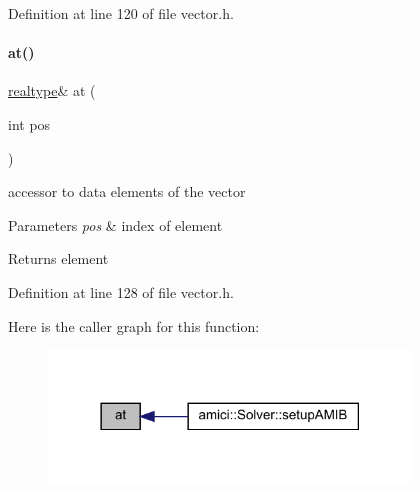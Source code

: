 Definition at line 120 of file vector.\+h.

\mbox{\label{classamici_1_1_ami_vector_ae62cf934983479ccb255785bdf455a2c}} 
\paragraph{\texorpdfstring{at()}{at()}}
{\footnotesize\ttfamily \mbox{\hyperlink{namespaceamici_a1bdce28051d6a53868f7ccbf5f2c14a3}{realtype}}\& at (\begin{DoxyParamCaption}\item[{int}]{pos }\end{DoxyParamCaption})}

accessor to data elements of the vector 
\begin{DoxyParams}{Parameters}
{\em pos} & index of element \\
\hline
\end{DoxyParams}
\begin{DoxyReturn}{Returns}
element 
\end{DoxyReturn}


Definition at line 128 of file vector.\+h.

Here is the caller graph for this function\+:
\nopagebreak
\begin{figure}[H]
\begin{center}
\leavevmode
\includegraphics[width=273pt]{classamici_1_1_ami_vector_ae62cf934983479ccb255785bdf455a2c_icgraph}
\end{center}
\end{figure}
